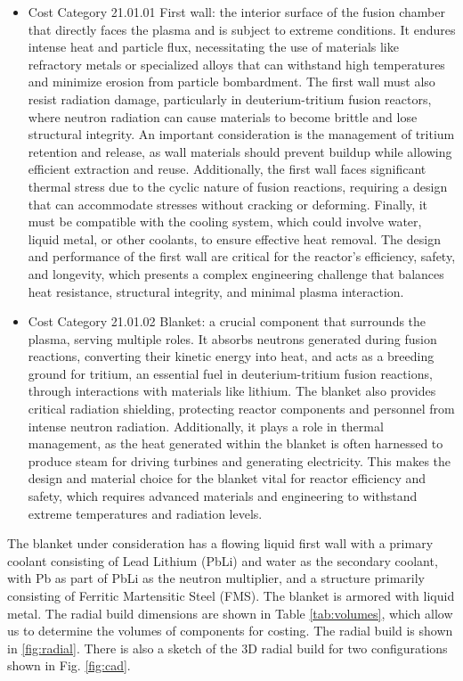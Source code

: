 \begin{itemize}
    \item Cost Category 21.01.01 First wall: the interior surface of the fusion chamber that directly faces the plasma and is subject to extreme conditions. It endures intense heat and particle flux, necessitating the use of materials like refractory metals or specialized alloys that can withstand high temperatures and minimize erosion from particle bombardment. The first wall must also resist radiation damage, particularly in deuterium-tritium fusion reactors, where neutron radiation can cause materials to become brittle and lose structural integrity. An important consideration is the management of tritium retention and release, as wall materials should prevent buildup while allowing efficient extraction and reuse. Additionally, the first wall faces significant thermal stress due to the cyclic nature of fusion reactions, requiring a design that can accommodate stresses without cracking or deforming. Finally, it must be compatible with the cooling system, which could involve water, liquid metal, or other coolants, to ensure effective heat removal. The design and performance of the first wall are critical for the reactor's efficiency, safety, and longevity, which presents a complex engineering challenge that balances heat resistance, structural integrity, and minimal plasma interaction.
    \item Cost Category 21.01.02 Blanket: a crucial component that surrounds the plasma, serving multiple roles. It absorbs neutrons generated during fusion reactions, converting their kinetic energy into heat, and acts as a breeding ground for tritium, an essential fuel in deuterium-tritium fusion reactions, through interactions with materials like lithium. The blanket also provides critical radiation shielding, protecting reactor components and personnel from intense neutron radiation. Additionally, it plays a role in thermal management, as the heat generated within the blanket is often harnessed to produce steam for driving turbines and generating electricity. This makes the design and material choice for the blanket vital for reactor efficiency and safety, which requires advanced materials and engineering to withstand extreme temperatures and radiation levels.
\end{itemize}

The blanket under consideration has a flowing liquid first wall with a primary coolant consisting of Lead Lithium (PbLi) and water as the secondary coolant, with Pb as part of PbLi as the neutron multiplier, and a structure primarily consisting of Ferritic Martensitic Steel (FMS).  The blanket is armored with liquid metal.  The radial build dimensions are shown in Table \ref{tab:volumes}, which allow us to determine the volumes of components for costing.  The radial build is shown in \ref{fig:radial}.   There is also a sketch of the 3D radial build for two configurations shown in Fig. \ref{fig:cad}.


